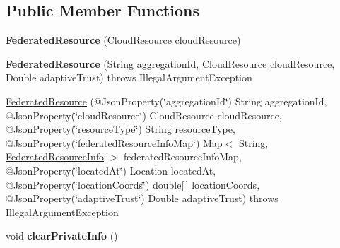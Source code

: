 \subsection*{Public Member Functions}
\begin{DoxyCompactItemize}
\item 
\mbox{\label{classeu_1_1h2020_1_1symbiote_1_1cloud_1_1model_1_1internal_1_1FederatedResource_a0e39fc5f8bd5914e2fd097effe4fb13e}} 
{\bfseries Federated\+Resource} (\hyperlink{classeu_1_1h2020_1_1symbiote_1_1cloud_1_1model_1_1internal_1_1CloudResource}{Cloud\+Resource} cloud\+Resource)
\item 
\mbox{\label{classeu_1_1h2020_1_1symbiote_1_1cloud_1_1model_1_1internal_1_1FederatedResource_a31e0ca4960f818daedf59484a4157791}} 
{\bfseries Federated\+Resource} (String aggregation\+Id, \hyperlink{classeu_1_1h2020_1_1symbiote_1_1cloud_1_1model_1_1internal_1_1CloudResource}{Cloud\+Resource} cloud\+Resource, Double adaptive\+Trust)  throws Illegal\+Argument\+Exception 
\item 
\hyperlink{classeu_1_1h2020_1_1symbiote_1_1cloud_1_1model_1_1internal_1_1FederatedResource_ad0bbb31499624d05a59a268866eae067}{Federated\+Resource} (@Json\+Property(\char`\"{}aggregation\+Id\char`\"{}) String aggregation\+Id, @Json\+Property(\char`\"{}cloud\+Resource\char`\"{}) Cloud\+Resource cloud\+Resource, @Json\+Property(\char`\"{}resource\+Type\char`\"{}) String resource\+Type, @Json\+Property(\char`\"{}federated\+Resource\+Info\+Map\char`\"{}) Map$<$ String, \hyperlink{classeu_1_1h2020_1_1symbiote_1_1cloud_1_1model_1_1internal_1_1FederatedResourceInfo}{Federated\+Resource\+Info} $>$ federated\+Resource\+Info\+Map, @Json\+Property(\char`\"{}located\+At\char`\"{}) Location located\+At, @Json\+Property(\char`\"{}location\+Coords\char`\"{}) double\mbox{[}$\,$\mbox{]} location\+Coords, @Json\+Property(\char`\"{}adaptive\+Trust\char`\"{}) Double adaptive\+Trust)  throws Illegal\+Argument\+Exception 
\item 
\mbox{\label{classeu_1_1h2020_1_1symbiote_1_1cloud_1_1model_1_1internal_1_1FederatedResource_a68d278c02319431bedf03656e40b6204}} 
void {\bfseries clear\+Private\+Info} ()
\item 

\end{DoxyCompactItemize}
